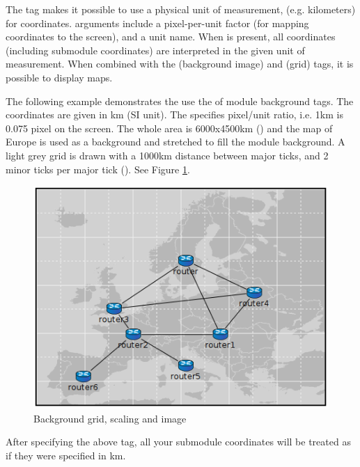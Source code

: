The  tag makes it possible to use a physical unit of measurement,
(e.g. kilometers) for coordinates.  arguments include a pixel-per-unit
factor (for mapping coordinates to the screen), and a unit name. When 
is present, all coordinates (including submodule coordinates) are interpreted
in the given unit of measurement. When combined with the  (background
image) and  (grid) tags, it is possible to display maps.

The following example demonstrates the use the of module background tags.
The coordinates are given in km (SI unit). The 
specifies pixel/unit ratio, i.e. 1km is 0.075 pixel on the screen.
The whole area is 6000x4500km () and the map of Europe is used as a
background and stretched to fill the module background.
A light grey grid is drawn with a 1000km distance between major ticks,
and 2 minor ticks per major tick ().
See Figure \ref{fig:graphics-bgtags}.

\begin{ned}
network EuropePlayground
{
    @display("bgb=6000,4500;bgi=maps/europe,s;bgg=1000,2,grey95;bgs=0.075,km");
\end{ned}

\begin{figure}[htbp]
  \begin{center}
    \includegraphics{figures/graphics-bgtags}
    \caption{Background grid, scaling and image}
    \label{fig:graphics-bgtags}
  \end{center}
\end{figure}

After specifying the above  tag, all your submodule coordinates will be treated as if
they were specified in km.

